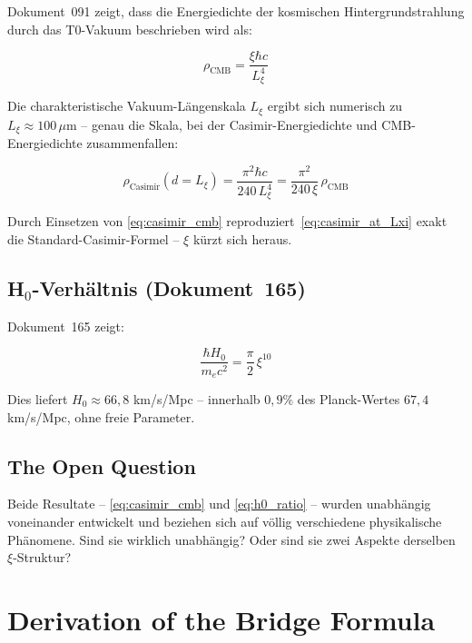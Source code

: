 Dokument~091 zeigt, dass die Energiedichte der kosmischen Hintergrundstrahlung
durch das T0-Vakuum beschrieben wird als:

\begin{equation}
    \rho_\text{CMB} = \frac{\xi \hbar c}{L_\xi^4}
    \label{eq:casimir_cmb}
\end{equation}

Die charakteristische Vakuum-Längenskala $L_\xi$ ergibt sich numerisch zu
$L_\xi \approx 100\,\mu\text{m}$ -- genau die Skala, bei der Casimir-Energiedichte
und CMB-Energiedichte zusammenfallen:

\begin{equation}
    \rho_\text{Casimir}(d = L_\xi)
    = \frac{\pi^2 \hbar c}{240\,L_\xi^4}
    = \frac{\pi^2}{240\,\xi}\,\rho_\text{CMB}
    \label{eq:casimir_at_Lxi}
\end{equation}

Durch Einsetzen von \eqref{eq:casimir_cmb} reproduziert~\eqref{eq:casimir_at_Lxi}
exakt die Standard-Casimir-Formel -- $\xi$ kürzt sich heraus.

\subsection{H\texorpdfstring{$_0$}{0}-Verhältnis (Dokument~165)}

Dokument~165 zeigt:

\begin{equation}
    \frac{\hbar H_0}{m_e c^2} = \frac{\pi}{2}\,\xi^{10}
    \label{eq:h0_ratio}
\end{equation}

Dies liefert $H_0 \approx 66{,}8$ km/s/Mpc -- innerhalb $0{,}9\%$ des
Planck-Wertes $67{,}4$ km/s/Mpc, ohne freie Parameter.

\subsection{The Open Question}

Beide Resultate -- \eqref{eq:casimir_cmb} und \eqref{eq:h0_ratio} -- wurden
unabhängig voneinander entwickelt und beziehen sich auf völlig verschiedene
physikalische Phänomene. Sind sie wirklich unabhängig? Oder sind sie zwei
Aspekte derselben $\xi$-Struktur?

\section{Derivation of the Bridge Formula}
\label{sec:derivation}

